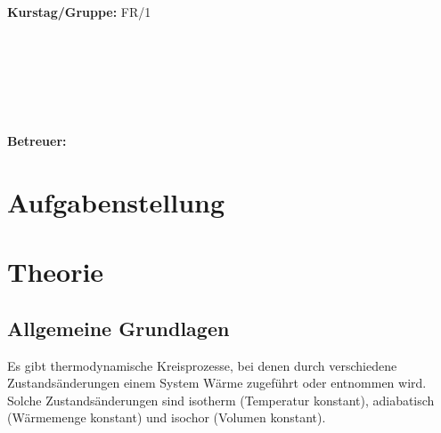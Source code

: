 \documentclass[12pt,a4paper,twopage]{article}
\begin{document}
\begin{verbatim}


\end{verbatim}
			\begin{flushleft}
			\textbf{\Large{Kurstag/Gruppe:}} \Large{FR/1}
			\end{flushleft}

\begin{verbatim}






\end{verbatim}
			\begin{flushleft}
			\LARGE{\textbf{Betreuer:\Large{ }}}		
			\end{flushleft}
			
\section{Aufgabenstellung}

\section{Theorie}
\subsection{Allgemeine Grundlagen}
Es gibt thermodynamische Kreisprozesse, bei denen durch verschiedene Zustandsänderungen einem System Wärme zugeführt oder entnommen wird. Solche Zustandsänderungen sind isotherm (Temperatur konstant), adiabatisch (Wärmemenge konstant) und isochor (Volumen konstant).
\end{document}
